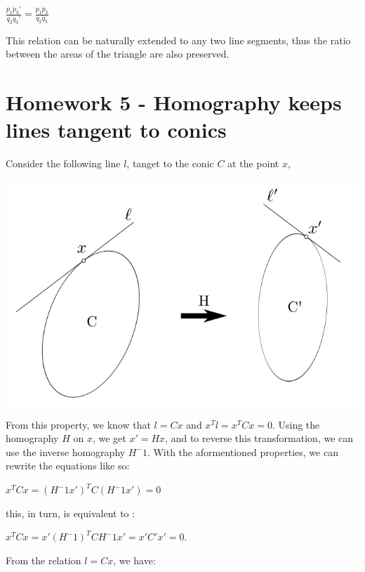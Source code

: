 \documentclass[]{article}
\begin{document}
\centerline {
	$\frac{\overline{p_1p_3}'}{\overline{q_2q_3}'} = \frac{\overline{p_1p_3}}{\overline{q_2q_3}}$
}

This relation can be naturally extended to any two line segments, thus the ratio between the areas of the triangle are also preserved. 


\section{Homework 5 - Homography keeps lines tangent to conics}
Consider the following line $l$, tanget to the conic $C$ at the point $x$, 

\centerline {
	\includegraphics[scale=0.5]{scr3}
}

From this property, we know that $l = Cx$ and $x^Tl=x^TCx = 0$. Using the homography $H$ on $x$, we get $x'=Hx$, and to reverse this transformation, we can use the inverse homography $H^-1$. With the aformentioned properties, we can rewrite the equations like so:

\vspace{0.5em}

\centerline {
	$x^TCx = (H^-1x')^TC(H^-1x') = 0$
}
\vspace{0.5em}

this, in turn, is equivalent to :

\vspace{0.5em}

\centerline {
	$x^TCx = x'(H^-1)^TCH^-1x' = x'C'x' = 0$.
}

\vspace{0.5em}

From the relation $l = Cx$, we have:

\vspace{0.5em}
\end{document}
